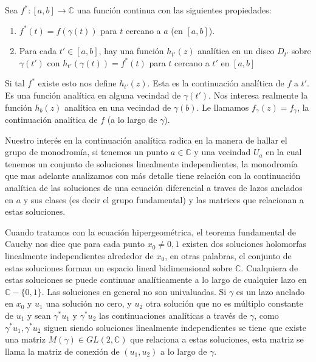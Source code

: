 \begin{defn}
Sea $f^{*}:[a,b] \rightarrow \mathbb{C}$  una funci\'on continua con las siguientes propiedades:
\begin{enumerate}
\item $f^{*}(t) =f (\gamma (t))$  para $t$ cercano a $a$ (en $[a,b]$).
\item Para cada $t' \in [a,b]$, hay una funci\'on $h_{t'}(z)$ anal\'itica en un disco $D_{t'}$ sobre $\gamma (t')$ con $h_{t'}(\gamma (t)) = f^{*}(t)$ para $t$ cercano a $t'$ en $[a,b]$
\end{enumerate}
Si tal $f^{*}$ existe esto nos define $h_{t'}(z)$. Esta es la continuaci\'on anal\'itica de $f$ a $t'$. Es una funci\'on anal\'itica en alguna vecindad de $\gamma (t')$. Nos interesa realmente la funci\'on $h_{b}(z)$ anal\'itica en una vecindad de $\gamma (b)$. Le llamamos $f_{\gamma} (z) = f_{\gamma}$, la continuaci\'on anal\'itica de $f$ (a lo largo de $\gamma$).
\end{defn}

Nuestro inter\'es en la continuaci\'on anal\'itica radica en la manera de hallar el grupo de monodrom\'ia, si tenemos un punto $a \in \mathbb{C}$ y una vecindad $U_{a}$ en la cual tenemos un conjunto de soluciones linealmente independientes, la monodrom\'ia que mas adelante analizamos con m\'as detalle tiene relaci\'on con la continuaci\'on anal\'itica de las soluciones de una ecuaci\'on diferencial a traves de lazos anclados en $a$ y sus clases (es decir el grupo fundamental) y las matrices que relacionan a estas soluciones.

Cuando tratamos con la ecuaci\'on hipergeom\'etrica, el teorema fundamental de Cauchy nos dice que para cada punto $x_{0} \neq 0,1$ existen dos soluciones holomorfas linealmente independientes alrededor de $x_{0}$, en otras palabras, el conjunto de estas soluciones forman un espacio lineal bidimensional sobre $\mathbb{C}$. Cualquiera de estas soluciones se puede continuar anal\'iticamente a lo largo de cualquier lazo en $\mathbb{C} - \lbrace0,1 \rbrace$. Las soluciones en general no son univaluadas. Si $\gamma$ es un lazo anclado en $x_{0}$ y $u_{1}$ una soluci\'on no cero, y $u_{2}$ otra soluci\'on que no es m\'ultiplo constante de $u_{1}$ y sean $\gamma^{*} u_{1}$ y $\gamma^{*} u_{2}$ las continuaciones anal\'iticas a trav\'es de $\gamma$, como $\gamma^{*} u_{1},\gamma^{*} u_{2}$ siguen siendo soluciones linealmente independientes se tiene que existe una matriz $M(\gamma) \in GL(2,\mathbb{C})$ que relaciona a estas soluciones, esta matriz se llama la matriz de conexi\'on de $(u_{1},u_{2})$ a lo largo de $\gamma$.

